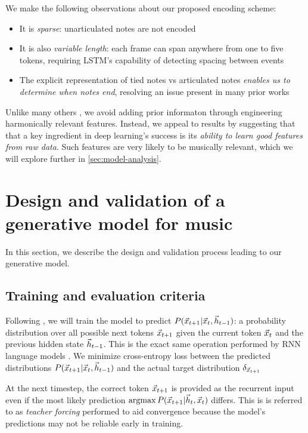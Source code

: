 We make the following observations about our proposed encoding scheme:
\begin{itemize}
  \item It is \emph{sparse}: unarticulated notes are not encoded
  \item It is also \emph{variable length}: each frame can span anywhere from one to five tokens, requiring
    LSTM's capability of detecting spacing between events\citep{gers2002learning}
  \item The explicit representation of tied notes vs articulated notes \emph{enables us to
    determine when notes end}, resolving an issue present in many prior works
    \citep{Eck2002,eck2008learning,Liu2014,Brien2016}
\end{itemize}

Unlike many others
\citep{mozer1994neural,franklin2004recurrent,laden1989representation}, we avoid
adding prior informaton through engineering harmonically relevant features.
Instead, we appeal to results by \citet{bengio2009learning,Bengio2011}
suggesting that that a key ingredient in deep learning's success is its \emph{ability
to learn good features from raw data}. Such features are very likely to be
musically relevant, which we will explore further in \cref{sec:model-analysis}.

\section{Design and validation of a generative model for music}

In this section, we describe the design and validation process leading to our
generative model.

\subsection{Training and evaluation criteria}

Following \citep{mozer1994neural}, we will train the model to predict
$P(\vec{x}_{t+1} | \vec{x}_t, \vec{h}_{t-1})$: a probability distribution over all possible
next tokens $\vec{x}_{t+1}$ given the current token $\vec{x}_{t}$ and the previous hidden
state $\vec{h}_{t-1}$. This is the exact same operation performed by RNN language
models \citep{Mikolov2010}. We minimize cross-entropy loss between the
predicted distributions $P(\vec{x}_{t+1} | \vec{x}_t, \vec{h}_{t-1})$ and the actual target
distribution $\delta_{\vec{x}_{t+1}}$

At the next timestep, the correct token $\vec{x}_{t+1}$ is provided as the recurrent
input even if the most likely prediction $\operatorname*{argmax} P(\vec{x}_{t+1} | \vec{h}_t, \vec{x}_t)$
differs. This is is referred to as \emph{teacher forcing}
\citep{williams1989learning} performed to aid convergence because the model's
predictions may not be reliable early in training.


